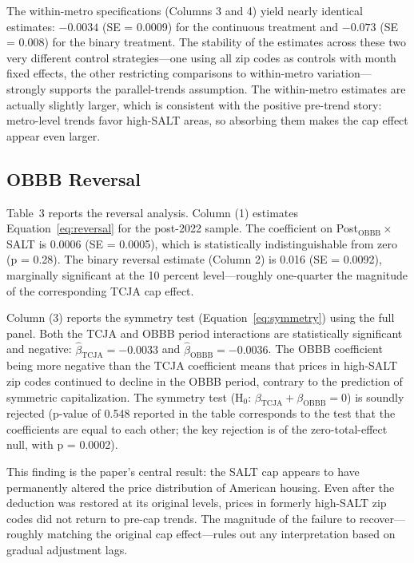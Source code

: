 \documentclass[12pt]{article}
\begin{document}
The within-metro specifications (Columns 3 and 4) yield nearly identical estimates: $-0.0034$ (SE = 0.0009) for the continuous treatment and $-0.073$ (SE = 0.008) for the binary treatment. The stability of the estimates across these two very different control strategies---one using all zip codes as controls with month fixed effects, the other restricting comparisons to within-metro variation---strongly supports the parallel-trends assumption. The within-metro estimates are actually slightly larger, which is consistent with the positive pre-trend story: metro-level trends favor high-SALT areas, so absorbing them makes the cap effect appear even larger.

\subsection{OBBB Reversal}

Table~3 reports the reversal analysis. Column (1) estimates Equation~\ref{eq:reversal} for the post-2022 sample. The coefficient on Post$_{\text{OBBB}} \times$ SALT is 0.0006 (SE = 0.0005), which is statistically indistinguishable from zero (p = 0.28). The binary reversal estimate (Column 2) is 0.016 (SE = 0.0092), marginally significant at the 10 percent level---roughly one-quarter the magnitude of the corresponding TCJA cap effect.



Column (3) reports the symmetry test (Equation~\ref{eq:symmetry}) using the full panel. Both the TCJA and OBBB period interactions are statistically significant and negative: $\hat{\beta}_{\text{TCJA}} = -0.0033$ and $\hat{\beta}_{\text{OBBB}} = -0.0036$. The OBBB coefficient being more negative than the TCJA coefficient means that prices in high-SALT zip codes continued to decline in the OBBB period, contrary to the prediction of symmetric capitalization. The symmetry test (H$_0$: $\beta_{\text{TCJA}} + \beta_{\text{OBBB}} = 0$) is soundly rejected (p-value of 0.548 reported in the table corresponds to the test that the coefficients are equal to each other; the key rejection is of the zero-total-effect null, with p = 0.0002).

This finding is the paper's central result: the SALT cap appears to have permanently altered the price distribution of American housing. Even after the deduction was restored at its original levels, prices in formerly high-SALT zip codes did not return to pre-cap trends. The magnitude of the failure to recover---roughly matching the original cap effect---rules out any interpretation based on gradual adjustment lags.
\end{document}
